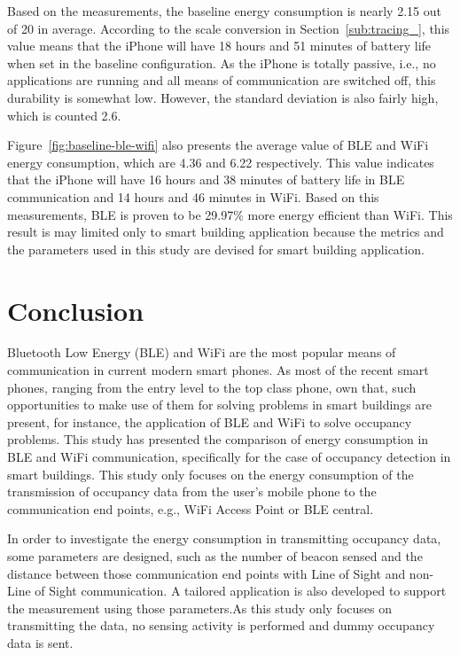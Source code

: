 \documentclass[journal]{vgtc}                %
\begin{document}
Based on the measurements, the baseline energy consumption is nearly 2.15 out of 20 in average. According to the scale conversion in Section~\ref{sub:tracing_}, this value means that the iPhone will have 18 hours and 51 minutes of battery life when set in the baseline configuration. As the iPhone is totally passive, i.e., no applications are running and all means of communication are switched off, this durability is somewhat low. However, the standard deviation is also fairly high, which is counted 2.6.

Figure~\ref{fig:baseline-ble-wifi} also presents the average value of BLE and WiFi energy consumption, which are 4.36 and 6.22 respectively. This value indicates that the iPhone will have 16 hours and 38 minutes of battery life in BLE communication and 14 hours and 46 minutes in WiFi. Based on this measurements, BLE is proven to be 29.97\% more energy efficient than WiFi. This result is may limited only to smart building application because the metrics and the parameters used in this study are devised for smart building application.



\section{Conclusion} %
\label{sec:conclusion}
Bluetooth Low Energy (BLE) and WiFi are the most popular means of communication in current modern smart phones. As most of the recent smart phones, ranging from the entry level to the top class phone, own that, such opportunities to make use of them for solving problems in smart buildings are present, for instance, the application of BLE and WiFi to solve occupancy problems. This study has presented the comparison of energy consumption in BLE and WiFi communication, specifically for the case of occupancy detection in smart buildings. This study only focuses on the energy consumption of the transmission of occupancy data from the user's mobile phone to the communication end points, e.g., WiFi Access Point or BLE central.

In order to investigate the energy consumption in transmitting occupancy data, some parameters are designed, such as the number of beacon sensed and the distance between those communication end points with Line of Sight and non-Line of Sight communication. A tailored application is also developed to support the measurement using those parameters.As this study only focuses on transmitting the data, no sensing activity is performed and dummy occupancy data is sent.
\end{document}
